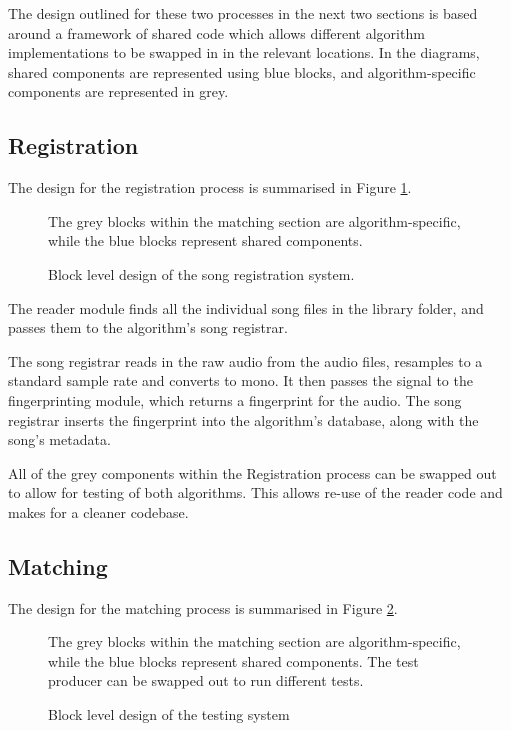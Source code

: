 \documentclass[12pt,a4paper,twoside,openright]{report}
\begin{document}
The design outlined for these two processes in the next two sections is based around a framework of shared code which allows different algorithm implementations to be swapped in in the relevant locations. In the diagrams, shared components are represented using blue blocks, and algorithm-specific components are represented in grey. 


\subsection{Registration}

The design for the registration process is summarised in Figure \ref{figs:registration_design}. 

\begin{figure}[h]
  \centering
  
  \caption{Block level design of the song registration system.}
  \label{figs:registration_design}
  \medskip \small
  The grey blocks within the matching section are algorithm-specific, while the blue blocks represent shared components.
\end{figure}

The reader module finds all the individual song files in the library folder, and passes them to the algorithm's song registrar.

The song registrar reads in the raw audio from the audio files, resamples to a standard sample rate and converts to mono. It then passes the signal to the fingerprinting module, which returns a fingerprint for the audio. The song registrar inserts the fingerprint into the algorithm's database, along with the song's metadata.

All of the grey components within the Registration process can be swapped out to allow for testing of both algorithms. This allows re-use of the reader code and makes for a cleaner codebase. %



\subsection{Matching}


The design for the matching process is summarised in Figure \ref{figs:matching_design}. 

\begin{figure}[h]
  \centering
  
  \caption{Block level design of the testing system}
  \label{figs:matching_design}
  \medskip \small
  The grey blocks within the matching section are algorithm-specific, while the blue blocks represent shared components. The test producer can be swapped out to run different tests.
\end{figure}
\end{document}
